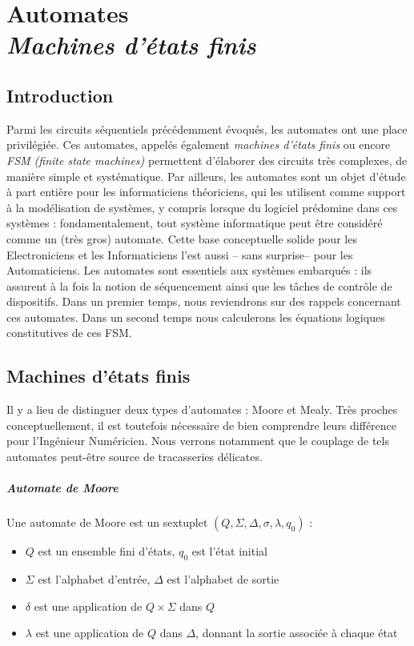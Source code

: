 \chapter[Machines d'états finis]{Automates\\ {\it Machines d'états finis}}
\minitoc
\section{Introduction}
Parmi les circuits séquentiels précédemment évoqués, les automates ont une place privilégiée. Ces automates, appelés également
{\it machines d'états finis} ou encore {\it FSM (finite state machines)} permettent d'élaborer des circuits très complexes, de manière
simple et systématique. Par ailleurs, les automates sont un objet d'étude à part entière pour les informaticiens théoriciens, qui les utilisent
comme support à la modélisation de systèmes, y compris lorsque du logiciel prédomine dans ces systèmes : fondamentalement, tout système informatique
peut être considéré comme un (très gros) automate. Cette base conceptuelle solide pour les Electroniciens et les Informaticiens l'est aussi -- sans surprise-- pour les Automaticiens.
Les automates sont essentiels aux
systèmes embarqués : ils assurent à la fois la notion de séquencement ainsi que les tâches de contrôle
de dispositifs. Dans un premier temps, nous reviendrons sur des rappels concernant ces automates.
Dans un second temps nous calculerons les équations logiques constitutives de ces FSM.

\section{Machines d'états finis}
Il y a lieu de distinguer deux types d'automates : Moore et Mealy. Très proches conceptuellement, il est toutefois nécessaire de
bien comprendre leurs différence pour l'Ingénieur Numéricien. Nous verrons notamment que le couplage de tels automates peut-être source
de tracasseries délicates.

\paragraph{Automate de Moore}

Une automate de Moore est un sextuplet $(Q, \Sigma, \Delta, \sigma, \lambda, q_0 )$ :
\begin{itemize}
\item $Q$ est un ensemble fini d’états, $q_0$ est l’état initial
\item $\Sigma$ est l’alphabet d’entrée, $\Delta$ est l’alphabet de sortie
\item $\delta$ est une application de $Q \times \Sigma $ dans $Q$
\item $\lambda$  est une application de $Q$ dans $\Delta$, donnant la sortie associée à chaque état
\end{itemize}

